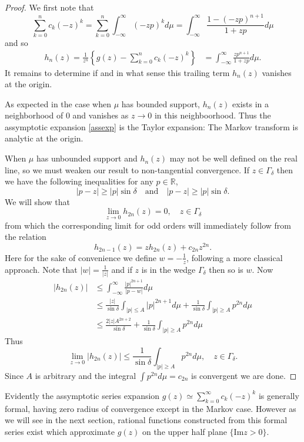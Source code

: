 \documentclass{amsart}
\theoremstyle{remark}
\numberwithin{equation}{section}
\newcommand{\RR}{\mathbb{R}}
\begin{document}
\begin{proof}
We first note that 
\[
    \sum_{k=0}^{n} c_k (-z)^k 
    = \sum_{k=0}^{n} \int_{-\infty}^\infty (-zp)^k d\mu
    = \int_{-\infty}^\infty \frac{1 - (-zp)^{n+1}}{1 + zp} d\mu
\]
and so
\begin{align*}
    h_n(z) = \frac1{z^n}\left\{g(z) - \sum_{k=0}^{n} c_k (-z)^k\right\}
    &= \int_{-\infty}^\infty \frac{zp^{n+1}}{1 + zp}d\mu.
\end{align*}
It remains to determine if and in what sense this trailing term $h_n(z)$ vanishes at the origin. 

As expected in the case when $\mu$ has bounded support, $h_n(z)$ exists in a neighborhood of $0$ and vanishes as $z \rightarrow 0$ in this neighboorhood. Thus the assymptotic expansion \ref{assexp} is the Taylor expansion: The Markov transform is analytic at the origin.

When $\mu$ has unbounded support and $h_n(z)$ may not be well defined on the real line, so we must weaken our result to non-tangential convergence. If $z \in \Gamma_\delta$ then we have the following inequalities for any $p \in \RR$,
\[
    |p - z| \geq |p| \sin \delta 
    \quad\text{and} \quad
    |p - z| \geq |p| \sin \delta.
\]
We will show that
\[
    \lim_{z \rightarrow 0} h_{2n}(z) = 0, \quad z \in \Gamma_\delta
\]
from which the corresponding limit for odd orders will immediately follow from the relation
\[
    h_{2n-1}(z)
    = zh_{2n}(z) + c_{2n}z^{2n}.
\] 
Here for the sake of convenience we define $w = -\frac1z$, following a more classical approach. Note that $|w| = \frac1{|z|}$ and if $z$ is in the wedge $\Gamma_\delta$ then so is $w$. Now 
\begin{align*}
    |h_{2n}(z)| 
    &\leq \int_{-\infty}^\infty \frac{|p|^{2n+1}}{|p - w|}d\mu \\
    &\leq \frac{|z|}{\sin \delta} \int_{|p| \leq A} |p|^{2n+1} d\mu
    + \frac1{\sin \delta} \int_{|p| \geq A} p^{2n} d\mu \\
    &\leq \frac{2|z| A^{2n+2}}{\sin \delta}
    + \frac1{\sin \delta} \int_{|p| \geq A} p^{2n} d\mu
\end{align*}
Thus 
\[
    \lim_{z \rightarrow 0} |h_{2n}(z)| \leq \frac1{\sin \delta} \int_{|p| \geq A} p^{2n} d\mu, \quad z \in \Gamma_\delta.
\]
Since $A$ is arbitrary and the integral $\int p^{2n} d\mu = c_{2n}$ is convergent we are done.
\end{proof}

Evidently the assymptotic series expansion $g(z) \simeq \sum_{k=0}^\infty c_k (-z)^k$ is generally formal, having zero radius of convergence except in the Markov case. However as we will see in the next section, rational functions constructed from this formal series exist which approximate $g(z)$ on the upper half plane $\{\text{Im} z > 0\}$.
\end{document}
